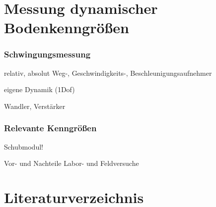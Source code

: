 \documentclass[hyperref={pdfpagemode=FullScreen, colorlinks=false}]{beamer}
\begin{document}
\maketitle

\section{Messung dynamischer Bodenkenngrößen}

\begin{frame}
\frametitle{Schwingungsmessung}
relativ, absolut
Weg-, Geschwindigkeits-, Beschleunigungsaufnehmer

eigene Dynamik (1Dof)

Wandler, Verstärker
\end{frame}

\begin{frame}
\frametitle{Relevante Kenngrößen}
Schubmodul!

Vor- und Nachteile Labor- und Feldversuche
\end{frame}






\section*{Literaturverzeichnis}

\begin{frame}[allowframebreaks]{}
	\printbibliography
\end{frame}
\end{document}
